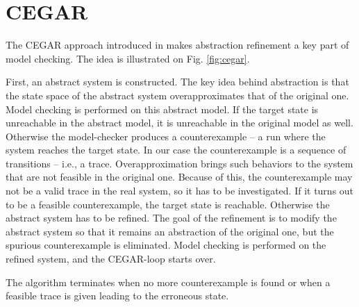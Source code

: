 \section{CEGAR}



The CEGAR approach introduced in  makes
abstraction refinement a key part of model checking. The idea is illustrated on
Fig. \ref{fig:cegar}.

First, an abstract system is constructed. The key idea behind abstraction is
that the state space of the abstract system overapproximates that of the original
one. 
Model checking is performed on this abstract model. If the target state is
unreachable in the abstract model, it is unreachable in the original model
as well. Otherwise the model-checker produces a counterexample -- a run where the
system reaches the target state. In our case the counterexample is a sequence of
transitions -- i.e., a trace. Overapproximation brings such behaviors to the system that are not feasible in the original one. Because of this, the counterexample may not be a valid trace in the real system, so it has to be investigated.
If it turns
out to be a feasible counterexample, the target state is reachable. Otherwise
the abstract system has to be refined. The goal of the refinement is to modify the abstract
system so that it remains an abstraction of the original one, but the spurious
counterexample is eliminated.  Model checking is performed on the
refined system, and the CEGAR-loop starts over. 

The algorithm terminates when no more
counterexample is found or when a feasible trace is
given leading to the erroneous state.